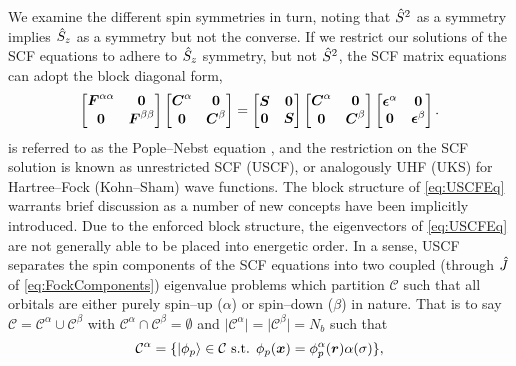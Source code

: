 We examine the different spin symmetries in turn, noting that $\hat{S}^2$ as a symmetry implies $\hat{S}_z$ as a symmetry
but not the converse. If we restrict our solutions of the SCF equations to adhere to $\hat{S}_z$ symmetry, but not
$\hat{S}^2$, the SCF matrix equations can adopt the block diagonal form,
\begin{equation}
  \label{eq:USCFEq}
  \begin{bmatrix}
    \boldsymbol{F}^{\alpha\alpha} & \boldsymbol{0} \\ \boldsymbol{0} & \boldsymbol{F}^{\beta\beta}
  \end{bmatrix}
  \begin{bmatrix}
    \boldsymbol{C}^{\alpha} & \boldsymbol{0} \\ \boldsymbol{0} & \boldsymbol{C}^{\beta}
  \end{bmatrix}
  =
  \begin{bmatrix}
    \boldsymbol{S} & \boldsymbol{0} \\ \boldsymbol{0} & \boldsymbol{S}
  \end{bmatrix}
  \begin{bmatrix}
    \boldsymbol{C}^{\alpha} & \boldsymbol{0} \\ \boldsymbol{0} & \boldsymbol{C}^{\beta}
  \end{bmatrix}
  \begin{bmatrix}
    \boldsymbol{\epsilon}^{\alpha} & \boldsymbol{0} \\ \boldsymbol{0} & \boldsymbol{\epsilon}^{\beta}
  \end{bmatrix}.
\end{equation}
 is referred to as the Pople--Nebst equation , and the restriction on the SCF
solution is known as unrestricted SCF (USCF), or analogously UHF (UKS) for Hartree--Fock (Kohn--Sham) wave functions.
The block structure of \cref{eq:USCFEq} warrants brief discussion as a number of new concepts have been implicitly
introduced. Due to the enforced block structure, the eigenvectors of \cref{eq:USCFEq} are not generally able
to be placed into energetic order. In a sense, USCF separates the spin components of the SCF equations into
two coupled (through $\hat{J}$ of \cref{eq:FockComponents}) eigenvalue problems which partition $\mathcal{C}$ such that all orbitals are either
purely spin--up ($\alpha$) or spin--down ($\beta$) in nature. That is to say
$\mathcal{C} = \mathcal{C}^\alpha  \cup \mathcal{C}^\beta$ with $\mathcal C^\alpha \cap \mathcal C^\beta = \emptyset$ and 
$\vert \mathcal C^\alpha \vert = \vert \mathcal C^\beta \vert = N_b$ such that
\begin{equation}
  \mathcal C^\alpha = \{ \left\vert \phi_p \right\rangle \in \mathcal C \text{ s.t. } \phi_p(\boldsymbol{x}) = \phi^\alpha_p(\boldsymbol{r}) \alpha(\sigma) \},
\end{equation}

